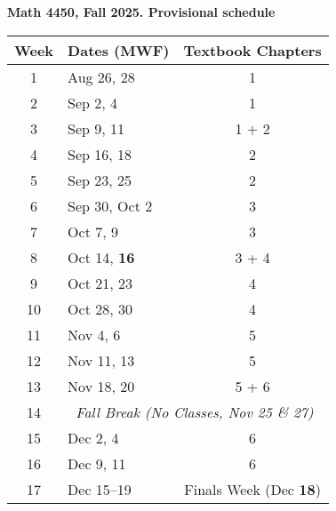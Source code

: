 \documentclass[11pt]{article}\usepackage[]{graphicx}\usepackage[]{xcolor}
\begin{document}
\rule{0mm}{2mm}

\vspace{-20mm}


\begin{center}\bf\Large
Math 4450, Fall 2025. Provisional schedule \\
\end{center}

\begin{longtable}{|c|l|c|}
\hline
\textbf{Week} & \textbf{Dates (MWF)} & \textbf{Textbook Chapters} \\
\hline
\endhead

1 & Aug 26, 28     & 1\\\hline
2 & Sep 2, 4       & 1\\\hline
3 & Sep 9, 11      & 1 + 2\\\hline
4 & Sep 16, 18     & 2 \\\hline
5 & Sep 23, 25     & 2 \\\hline
6 & Sep 30, Oct 2  & 3 \\\hline
7 & Oct 7, 9       & 3 \\\hline
8 & Oct 14, {\color{blue} \textbf{16}} & 3 + 4\\\hline
9 & Oct 21, 23     &  4 \\\hline
10 & Oct 28, 30    &  4 \\\hline
11 & Nov 4, 6      &  5 \\\hline
12 & Nov 11, 13    &  5 \\\hline
13 & Nov 18, 20    &  5 + 6\\\hline
14 & \multicolumn{2}{|c|}{\textit{Fall Break (No Classes, Nov 25 \& 27)}} \\\hline
15 & Dec 2, 4      &  6 \\\hline
16 & Dec 9, 11     &  6 \\\hline
17 & Dec 15--19 & Finals Week ({\color{blue}Dec \textbf{18}}) \\ \hline

\end{longtable}
\end{document}
